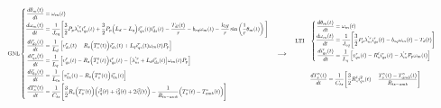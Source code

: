 \documentclass[blue,fullpaper]{ludusofficial}  %
\begin{document}
\[
\resizebox{\textwidth}{!}{$\displaystyle
    \text{GNL} 
    \begin{cases}
        \begin{aligned} 
            \frac{d\theta_m(t)}{dt} & = \omega_m(t) \\
            \frac{d\omega_{m}(t)}{dt} & = \frac{1}{J_{eq}} \Bigg[ \frac{3}{2}P_{p} \lambda_{m}^{'r} i_{qs}^{r}(t) + \frac{3}{2} P_{p} \Big( L_{d} - L_{q} \Big) i_{qs}^{r}(t) i_{ds}^{r}(t)  - \frac{T_{dl}(t)}{r} - b_{eq}  \omega_{m}(t) - \frac{k_{l}g}{r} \sin \left(  \frac{1}{r} \theta_{m}(t) \right) \Bigg]  \\
            \frac{di_{ds}^{r}(t)}{dt} & = \frac{1}{L_{d}} \left[ v_{ds}^{r}(t) - R_{s} \Big( T_{s}^{\circ} (t) \Big) i_{ds}^{r}(t) + L_{q}i_{qs}^{r}(t) \omega_{m}(t)P_{p}  \right]  \\
            \frac{di_{qs}^{r}(t)}{dt}  & = \frac{1}{L_{q} } \left[ v_{qs}^{r}(t) - R_{s} \Big( T_{s}^{\circ} (t) \Big) i_{qs}^{r}(t) - \big[ \lambda_{m}^{'r} + L_{d} i_{ds}^{r}(t) \big] \omega_{m}(t)P_{p} \right]  \\
            \frac{di_{0s}^{r}(t)}{dt} & = \frac{1}{ L_{ls} } \left[ v_{0s}^{r}(t) - R_{s} \Big( T_{s}^{\circ} (t) \Big) i_{0s}^{r}(t) \right] \\
            \frac{dT_{s}^{\circ}(t)}{dt} & = \frac{1}{C_{ts}} \Bigg[ \frac{3}{2} R_{s}\Big( T_{s}^{\circ}(t) \Big) \Big( i_{q}^{2}(t) + i_{d}^{2}(t) + 2i_{0}^{2}(t) \Big) - \frac{1}{R_{ts-amb}} \Big( T_{s}^{\circ}(t) - T_{amb}^{\circ}(t) \Big) \Bigg]
        \end{aligned}
    \end{cases} 
    \implies \quad
    \begin{aligned}
        \text{LTI} \quad & 
        \begin{cases}
            \begin{aligned}
                \frac{d\theta_m(t)}{dt} & = \omega_m(t) \\
                \frac{d\omega_{m}(t)}{dt} & = \frac{1}{J_{eq}} \Bigg[ \frac{3}{2}P_{p} \lambda_{m}^{'r} i_{qs}^{r}(t) - b_{eq}  \omega_{m}(t) - T_{d}(t) \Bigg]  \\
                \frac{di_{qs}^{r}(t)}{dt}  & = \frac{1}{L_{q} } \left[ v_{qs}^{r}(t) - R_{s}^{\ell} i_{qs}^{r}(t) - \lambda_{m}^{'r}P_{p} \omega_{m}(t) \right]
            \end{aligned}
        \end{cases} \\[4mm]
        & \frac{dT_{s}^{\circ}(t)}{dt} = \frac{1}{C_{ts}} \Bigg[ \frac{3}{2} R_{s}^{\ell}i_{qs}^{2}(t)  - \frac{T_{s}^{\circ}(t) - T_{amb}^{\circ}(t)}{R_{ts-amb}} \Bigg]
    \end{aligned}
$}
\]
\end{document}
